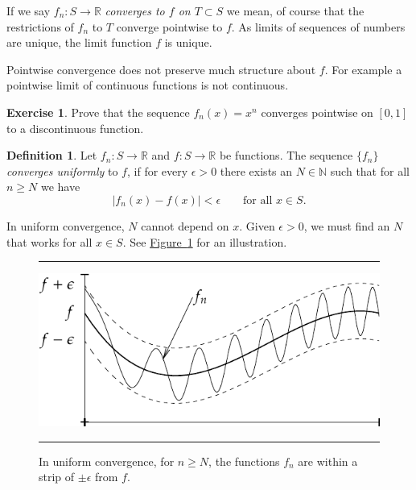 \documentclass[12pt,openany]{book}
\newcommand{\abs}[1]{\left\lvert {#1} \right\rvert}
\newcommand{\R}{{\mathbb{R}}}
\newcommand{\N}{{\mathbb{N}}}
\newcommand{\myindex}[1]{#1\index{#1}}
\theoremstyle{plain}
\theoremstyle{remark}
\theoremstyle{definition}
\newtheorem{defn}[thm]{Definition}
\newenvironment{exbox}{%
    \def\FrameCommand{\vrule width 1pt \relax\hspace{10pt}}%
    \MakeFramed{\advance\hsize-\width\FrameRestore}%
}{%
    \endMakeFramed
}
\newenvironment{myfig}{%
\begin{figure}[h!t]
\noindent\rule{\textwidth}{0.4pt}\vspace{12pt}\par\centering}%
{\par\noindent\rule{\textwidth}{0.4pt}
\end{figure}}
\theoremstyle{exercise}
\newtheorem{exercise}{Exercise}[section]
\theoremstyle{example}
\newtheorem{example}[thm]{Example}
\newcommand{\figureref}[1]{\hyperref[#1]{Figure~\ref*{#1}}}
\begin{document}
If we say $f_n \colon S \to \R$
\emph{converges to $f$ on $T \subset S$}
we mean, of course that
the restrictions of $f_n$ to $T$ converge pointwise to $f$.
As limits of sequences of numbers are unique, the limit function $f$ is unique.

Pointwise convergence does not preserve much structure about $f$.
For example a pointwise limit of continuous functions is not continuous.

\begin{exbox}
\begin{exercise}
Prove that the sequence $f_n(x) = x^{n}$ converges pointwise on $[0,1]$ to
a discontinuous function.
\end{exercise}
\end{exbox}


\begin{defn}
Let $f_n \colon S \to \R$
and $f \colon S \to \R$
be functions.  The sequence $\{ f_n \}$
\emph{\myindex{converges uniformly}} to $f$, if for
every $\epsilon > 0$ there exists an $N \in \N$ such that 
for all $n \geq N$ we have
\begin{equation*}
\abs{f_n(x) - f(x)} < \epsilon \qquad \text{for all } x \in S.
\end{equation*}
\end{defn}

In uniform convergence, $N$ cannot depend on $x$.  Given $\epsilon > 0$,
we must find an $N$ that works for all $x \in S$.  See
\figureref{fig:uniformconv} for an illustration.
\begin{myfig}
\includegraphics{figures/uniformconv}
\caption{In uniform convergence,
for $n \geq N$,
the functions $f_n$ are within a strip of $\pm\epsilon$ from $f$.%
\label{fig:uniformconv}}
\end{myfig}
\end{document}
